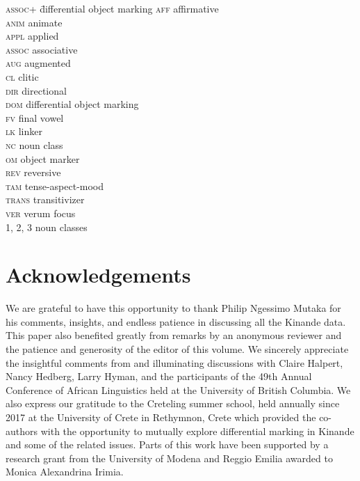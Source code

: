 \documentclass[output=paper]{langscibook}
\begin{document}
\begin{multicols}{2}
    \begin{tabbing}
        \textsc{assoc}+ \=differential object marking\kill
        \textsc{aff}   \>affirmative \\
        \textsc{anim}  \>animate \\
        \textsc{appl}  \>applied \\
        \textsc{assoc} \>associative \\
        \textsc{aug}   \>augmented \\
        \textsc{cl}    \>clitic \\
        \textsc{dir}   \>directional\\
        \textsc{dom}   \>differential object marking\\
        \textsc{fv}    \>final vowel\\
        \textsc{lk}    \>linker\\
        \textsc{nc}    \>noun class\\
        \textsc{om}    \>object marker\\
        \textsc{rev}   \>reversive\\
        \textsc{tam}   \>tense-aspect-mood\\
        \textsc{trans} \>transitivizer\\
        \textsc{ver}   \>verum focus\\
        1, 2, 3        \>noun classes
    \end{tabbing}
\end{multicols}


\section*{Acknowledgements}

We are grateful to have this opportunity to thank Philip Ngessimo Mutaka for his comments, insights, and endless patience in discussing all the Kinande data. This paper also benefited greatly from remarks by an anonymous reviewer and the patience and generosity of the editor of this volume. We sincerely appreciate the insightful comments from and illuminating discussions with Claire Halpert, Nancy Hedberg, Larry Hyman, and the participants of the 49th Annual Conference of African Linguistics held at the University of British Columbia. We also express our gratitude to the Creteling summer school, held annually since 2017 at the University of Crete in Rethymnon, Crete which provided the co-authors with the opportunity to mutually explore differential marking in Kinande and some of the related issues. Parts of this work have been supported by a research grant from the University of Modena and Reggio Emilia awarded to Monica Alexandrina Irimia. 

{\sloppy\printbibliography[heading=subbibliography,notkeyword=this]}
\end{document}
